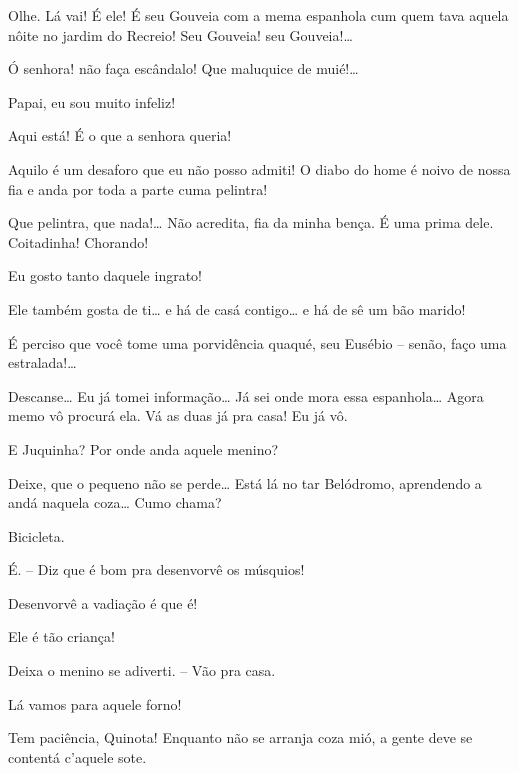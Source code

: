 
 Olhe. Lá vai! É ele! É seu Gouveia com a mema espanhola cum
quem tava aquela nôite no jardim do Recreio!  Seu Gouveia!
seu Gouveia!\ldots{}

  Ó senhora! não faça escândalo! Que
maluquice de muié!\ldots{}

  Papai, eu sou muito infeliz!

 Aqui está! É o que a senhora queria!

 Aquilo é um desaforo que eu não posso admiti! O diabo do home é
noivo de nossa fia e anda por toda a parte cuma pelintra!

 Que pelintra, que nada!\ldots{} Não acredita, fia da minha bença. É
uma prima dele. Coitadinha! Chorando! 

 Eu gosto tanto daquele ingrato!

 Ele também gosta de ti\ldots{} e há de casá contigo\ldots{} e há de sê um
bão marido!

  É perciso que você tome uma
porvidência quaqué, seu Eusébio -- senão, faço uma estralada!\ldots{}

  Descanse\ldots{} Eu já tomei informação\ldots{} Já sei onde mora
essa espanhola\ldots{} Agora memo vô procurá ela. Vá as duas já pra casa! Eu já vô.

 E Juquinha? Por onde anda aquele menino?

 Deixe, que o pequeno não se perde\ldots{} Está lá no tar Belódromo,
aprendendo a andá naquela coza\ldots{} Cumo chama?

 Bicicleta.

 É. -- Diz que é bom pra desenvorvê os músquios!

 Desenvorvê a vadiação é que é!

 Ele é tão criança!

 Deixa o menino se adiverti. -- Vão pra casa.

 Lá vamos para aquele forno!

 Tem paciência, Quinota! Enquanto não se arranja coza mió, a gente
deve se contentá c’aquele sote.

